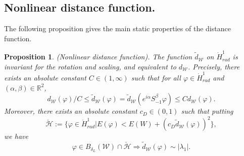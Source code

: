 \documentclass[reqno, 11pt]{amsart}
\numberwithin{equation}{section}
\newcommand{\R}{\mathbb{R}}
\theoremstyle{plain}
\newtheorem{proposition}[theorem]{Proposition}
\theoremstyle{definition}
\numberwithin{equation}{section}
\numberwithin{theorem}{section}
\numberwithin{equation}{section}
\numberwithin{equation}{section}
\numberwithin{theorem}{section}
\begin{document}
	\subsection{Nonlinear distance function.}
	The following proposition gives the main static properties of the distance function.
	\begin{proposition}(Nonlinear distance function)\label{prop:nlr dist}. The function $\widetilde{d}_{\mathcal{W}}$ on $\dot H^1_{rad}$ is invariant for the rotation and scaling, and equivalent to $d_{\mathcal{W}}$. Precisely, there exists an absolute constant $C\in\left(1,\infty\right)$ such that for all $\varphi\in \dot H^1_{rad}$ and $(\alpha,\beta)\in \R^2$,
		\begin{equation*}
		d_{\mathcal{W}}(\varphi)/C \leq \widetilde{d}_{\mathcal{W}}(\varphi)=\widetilde{d}_{\mathcal{W}}(e^{i\alpha}S_{-1}^{\beta}\varphi) \leq C	d_{\mathcal{W}}(\varphi).
		\end{equation*}
Moreover, there  exists an absolute constant $c_D\in\left(0,1\right)$ such that putting
		\begin{equation*}
		\check{\mathcal{H}}:=\{ \varphi\in \dot H^1_{rad}| E(\varphi)<E(W)+(c_D\widetilde{d}_{\mathcal{W}}(\varphi))^2\},
		\end{equation*}
		we have
		\begin{equation}\label{est:dist eigen}
		\varphi\in B_{\delta_L}(\mathcal{W}) \cap \check{\mathcal{H}} \Longrightarrow \widetilde{d}_{\mathcal{W}}(\varphi) \sim |\lambda_{1}|.
		\end{equation}
	\end{proposition}
	
\end{document}
